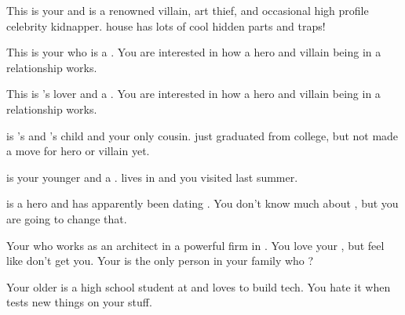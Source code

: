 \documentclass[char]{LRSguildcamp1}
\begin{document}
\begin{contacts}
	\contact{\cGrandma{}} This is your \cGrandma{\grandparent} and is a renowned villain, art thief, and occasional high profile celebrity kidnapper. \cGrandma{\Their} house has lots of cool hidden parts and traps!
	
	\contact{\cOldest{}} This is your \cOldest{\uncle} who is a \cOldest{\villain}.  You are interested in how a hero and villain being in a relationship works. 
	
	\contact{\cOS{}} This is \cOldest{}'s lover and a \cOS{\hero}. You are interested in how a hero and villain being in a relationship works. 
	
	\contact{\cGrad{}} \cGrad{} is \cOldest{}'s and \cOS{}'s child and your only cousin. \cGrad{\They} just graduated from college, but \cGrad{\have} not made a move for hero or villain yet. 
	
	\contact{\cYoungest{}} \cYoungest{} is your younger \cYoungest{\uncle} and a \cYoungest{\hero}. \cYoungest{} lives in \pCityYoungest{} and you visited \cYoungest{\them} last summer.  
	
	\contact{\cYS{}} \cYS{} is a hero and has apparently been dating \cYoungest{}. You don't know much about \cYS{\them}, but you are going to change that. 
	
	\contact{\cArchitect{}} Your \cArchitect{\parent} who works as an architect in a powerful firm in \pCityArchitect{}.  You love your \cArchitect{\parent}, but feel like \cArchitect{\they} don't get you. Your \cArchitect{\parent} is the only person in your family who ?
	
	 	\contact{\cTeen{}} Your older \cTeen{\sibling} is a high school student at \pNormalSchool{} and loves to build tech. You hate it when \cTeen{} tests new things on your stuff. 
		
\end{contacts}
\end{document}
